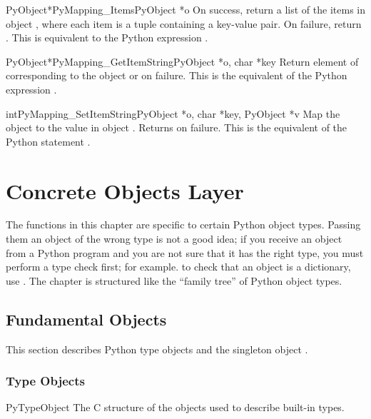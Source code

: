 \documentclass{manual}
\begin{document}
\begin{cfuncdesc}{PyObject*}{PyMapping_Items}{PyObject *o}
On success, return a list of the items in object , where
each item is a tuple containing a key-value pair.  On
failure, return \NULL{}. This is equivalent to the Python
expression .
\end{cfuncdesc}


\begin{cfuncdesc}{PyObject*}{PyMapping_GetItemString}{PyObject *o, char *key}
Return element of  corresponding to the object  or
\NULL{} on failure. This is the equivalent of the Python expression
.
\end{cfuncdesc}

\begin{cfuncdesc}{int}{PyMapping_SetItemString}{PyObject *o, char *key, PyObject *v}
Map the object  to the value  in object .
Returns  on failure.  This is the equivalent of the Python
statement .
\end{cfuncdesc}


\chapter{Concrete Objects Layer \label{concrete}}

The functions in this chapter are specific to certain Python object
types.  Passing them an object of the wrong type is not a good idea;
if you receive an object from a Python program and you are not sure
that it has the right type, you must perform a type check first;
for example. to check that an object is a dictionary, use
.  The chapter is structured like the
``family tree'' of Python object types.


\section{Fundamental Objects \label{fundamental}}

This section describes Python type objects and the singleton object 
.


\subsection{Type Objects \label{typeObjects}}

\begin{ctypedesc}{PyTypeObject}
The C structure of the objects used to describe built-in types.
\end{ctypedesc}
\end{document}
